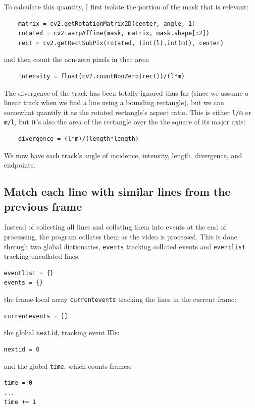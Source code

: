 \documentclass[notitlepage,12pt]{article}
\begin{document}
To calculate this quantity, I first isolate the portion of the mask that is relevant:
\begin{lstlisting}
    matrix = cv2.getRotationMatrix2D(center, angle, 1)
    rotated = cv2.warpAffine(mask, matrix, mask.shape[:2])
    rect = cv2.getRectSubPix(rotated, (int(l),int(m)), center)
\end{lstlisting}    
and then count the non-zero pixels in that area:
\begin{lstlisting}
    intensity = float(cv2.countNonZero(rect))/(l*m)
\end{lstlisting}    

The divergence of the track has been totally ignored thus far (since we assume a linear track when we find a line using a bounding rectangle), but we can somewhat quantify it as the rotated rectangle's aspect ratio.  This is either \texttt{l/m} or \texttt{m/l}, but it's also the area of the rectangle over the the square of its major axis:
\begin{lstlisting}
    divergence = (l*m)/(length*length)
\end{lstlisting}
    
We now have each track's angle of incidence, intensity, length, divergence, and endpoints.

\subsection{Match each line with similar lines from the previous frame}

Instead of collecting all lines and collating them into events at the end of processing, the program collates them as the video is processed.  This is done through two global dictionaries, \texttt{events} tracking collated events and \texttt{eventlist} tracking uncollated lines:
\begin{lstlisting}
eventlist = {}
events = {}
\end{lstlisting}    
the frame-local array \texttt{currentevents} tracking the lines in the current frame:
\begin{lstlisting}
currentevents = []
\end{lstlisting}    
the global \texttt{nextid}, tracking event IDs:
\begin{lstlisting}
nextid = 0
\end{lstlisting}    
and the global \texttt{time}, which counts frames:
\begin{lstlisting}
time = 0
...
time += 1
\end{lstlisting}    
\end{document}
